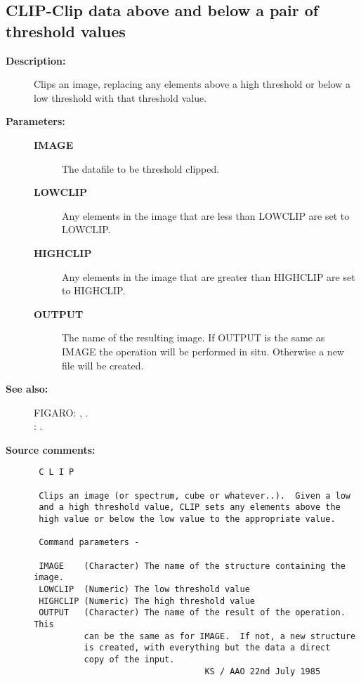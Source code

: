 \subsection{CLIP-\label{CLIP}Clip data above and below a pair of threshold values}
\begin{description}

\item [{\bf Description:}]
 Clips an image, replacing any elements above a high threshold or
 below a low threshold with that threshold value.

\item [{\bf Parameters:}]
\begin{description}
\item [{\bf IMAGE}]
 The datafile to be threshold clipped.
\item [{\bf LOWCLIP}]
 Any elements in the image that are less than LOWCLIP are
 set to LOWCLIP.
\item [{\bf HIGHCLIP}]
 Any elements in the image that are greater than HIGHCLIP
 are set to HIGHCLIP.
\item [{\bf OUTPUT}]
 The name of the resulting image.  If OUTPUT is the
 same as IMAGE the operation will be performed in situ.
 Otherwise a new file will be created.
\end{description}

\item [{\bf See also:}]
FIGARO: , .\\
: .\\

\item [{\bf Source comments:}]
\begin{verbatim}
 C L I P

 Clips an image (or spectrum, cube or whatever..).  Given a low
 and a high threshold value, CLIP sets any elements above the
 high value or below the low value to the appropriate value.

 Command parameters -

 IMAGE    (Character) The name of the structure containing the image.
 LOWCLIP  (Numeric) The low threshold value
 HIGHCLIP (Numeric) The high threshold value
 OUTPUT   (Character) The name of the result of the operation.  This
          can be the same as for IMAGE.  If not, a new structure
          is created, with everything but the data a direct
          copy of the input.
                                  KS / AAO 22nd July 1985
\end{verbatim}
\end{description}
